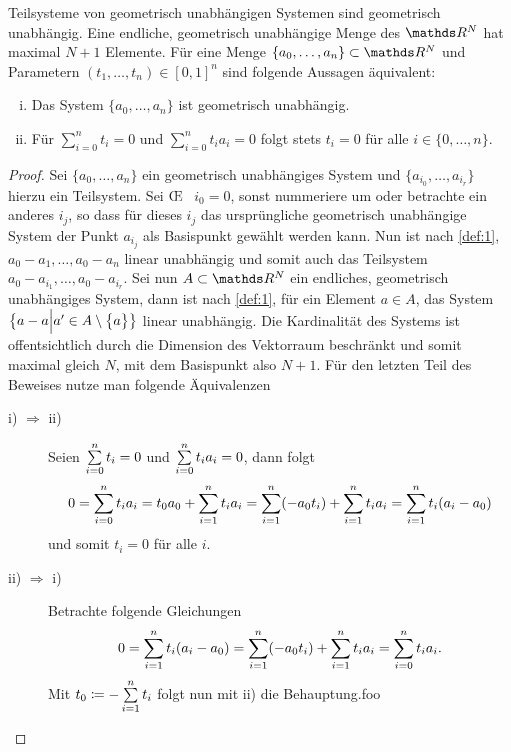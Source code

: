 \begin{Lem}\label{lem:1}
  Teilsysteme von geometrisch unabhängigen Systemen sind geometrisch
  unabhängig. Eine endliche, geometrisch unabhängige Menge des $\R^N$
  hat maximal $N+1$ Elemente. Für eine Menge
  $\{ a_0 , \ldots , a_n \} \subset \R^N$ und Parametern
  $(t_1,\ldots ,t_n) \in [0,1]^n$ sind folgende Aussagen äquivalent:

  \begin{enumerate}[(i)]
  \item Das System $\{ a_0 , \ldots , a_n \}$ ist geometrisch
    unabhängig.
  \item Für $\sum\limits_{i=0}^n t_i = 0$ und
    $\sum\limits_{i=0}^n t_i a_i = 0$ folgt stets $t_i = 0$ für alle
    $i \in \{ 0,\ldots,n\}$.
  \end{enumerate}
\end{Lem}
\begin{proof}
    Sei $\{ a_0 , \ldots , a_n \}$ ein geometrisch unabhängiges System
    und $\{ a_{i_0},\ldots,a_{i_r} \}$ hierzu ein Teilsystem.  Sei
    \OE~ $i_0 = 0$, sonst nummeriere um oder betrachte ein anderes
    $i_j$, so dass für dieses $i_j$ das ursprüngliche geometrisch
    unabhängige System der Punkt $a_{i_j}$ als Basispunkt gewählt
    werden kann. Nun ist nach \cref{def:1},
    $ a_0 - a_1 , \ldots , a_0 - a_n$ linear unabhängig und somit auch
    das Teilsystem $ a_0 - a_ {i_1}, \ldots , a_0 - a_{i_r}$.  Sei nun
    $A \subset \R^N$ ein endliches, geometrisch unabhängiges System,
    dann ist nach \cref{def:1}, für ein Element $a \in A$, das System
    $\bigl\{ a - a \Big| a' \in A \setminus \sset{a} \bigr\}$
    linear unabhängig.
    Die Kardinalität des Systems ist offentsichtlich durch die
    Dimension des Vektorraum beschränkt und somit maximal gleich $N$,
    mit dem Basispunkt also $N+1$. Für den letzten Teil des Beweises
    nutze man folgende Äquivalenzen

    \begin{description}
    \item[i) $\Rightarrow$ ii)] Seien $\sp{0}{n} t_i = 0$ und $\sp{0}{n} t_i
      a_i = 0$, dann folgt 
      \begin{gather*}
        0 = \sp{0}{n} t_i a_i = t_0 a_0 + \sp{1}{n} t_i a_i =
        \sp{1}{n} (-a_0 t_i) + \sp{1}{n} t_i a_i = \sp{1}{n} t_i (a_i -
        a_0)
    \end{gather*}
    und somit $t_i = 0$ für alle $i$.
      \item[ii) $\Rightarrow$ i)] Betrachte folgende Gleichungen
        \begin{gather*}
          0 = \sp{1}{n} t_i (a_i - a_0) = \sp{1}{n} (-a_0 t_i) +
          \sp{1}{n} t_i a_i = \sp{0}{n} t_i a_i.
        \end{gather*}
        Mit $t_0 \coloneqq - \sp{1}{n} t_i$ folgt nun mit ii) die
        Behauptung.\qedhere foo
    \end{description}
  \end{proof}

